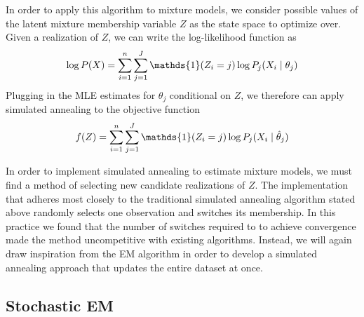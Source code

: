 \documentclass{article}
\newcommand*{\I}{\mathds{1}}
\newcommand*{\cond}{\;\ifnum\currentgrouptype=16 \middle\fi|\;}
\theoremstyle{definition}
\theoremstyle{algodesc}
\begin{document}
In order to apply this algorithm to mixture models, we consider possible values of the latent mixture membership variable $Z$ as the state space to optimize over. Given a realization of $Z$, we can write the log-likelihood function as
\begin{equation*}
\log P(X) = \sum_{i=1}^n \sum_{j=1}^J \I(Z_i = j) \log P_j(X_i \cond \theta_j)
\end{equation*}
Plugging in the MLE estimates for $\theta_j$ conditional on $Z$, we therefore can apply simulated annealing to the objective function
\begin{equation} \label{eq:sa_obj}
f(Z) = \sum_{i=1}^n \sum_{j=1}^J \I(Z_i = j) \log P_j(X_i \cond \hat{\theta}_j)
\end{equation}


In order to implement simulated annealing to estimate mixture models, we must find a method of selecting new candidate realizations of $Z$. The implementation that adheres most closely to the traditional simulated annealing algorithm stated above randomly selects one observation and switches its membership. In this practice we found that the number of switches required to to achieve convergence made the method uncompetitive with existing algorithms. Instead, we will again draw inspiration from the EM algorithm in order to develop a simulated annealing approach that updates the entire dataset at once.


\subsection{Stochastic EM}
\end{document}
